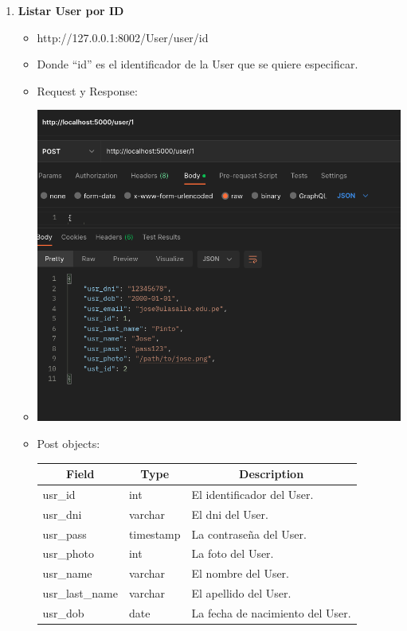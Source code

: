 \documentclass{article}
\begin{document}
\begin{enumerate}
    \item \textbf{Listar User por ID}
    \begin{itemize}
        \item http://127.0.0.1:8002/User/user/id
        \item Donde ``id'' es el identificador de la User que se quiere especificar.
        \item Request y Response:
        \item \includegraphics[scale=.5]{assets/user/user1.png}
        \item Post objects: \begin{table}[H] \centering \begin{tabular}{|l|l|l|}
        \hline \multicolumn{1}{|c|}{\textbf{Field}} &
        \multicolumn{1}{c|}{\textbf{Type}} &
        \multicolumn{1}{c|}{\textbf{Description}} \\ \hline usr\_id & int & El
        identificador del User. \\ \hline usr\_dni & varchar & El dni del User.
        \\ \hline usr\_pass & timestamp & La contraseña del User. \\ \hline
        usr\_photo & int & La foto del User. \\ \hline usr\_name & varchar & El
        nombre del User. \\ \hline usr\_last\_name & varchar & El apellido del
        User. \\ \hline usr\_dob & date & La fecha de nacimiento del User. \\

\end{tabular}
\end{table}
\end{itemize}
\end{enumerate}
\end{document}

